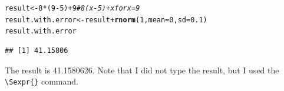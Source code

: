 \documentclass{article}\usepackage[]{graphicx}\usepackage[]{xcolor}
\makeatletter
\newcommand{\hlnum}[1]{\textcolor[rgb]{0.686,0.059,0.569}{#1}}%
\newcommand{\hlcom}[1]{\textcolor[rgb]{0.678,0.584,0.686}{\textit{#1}}}%
\newcommand{\hlopt}[1]{\textcolor[rgb]{0,0,0}{#1}}%
\newcommand{\hldef}[1]{\textcolor[rgb]{0.345,0.345,0.345}{#1}}%
\newcommand{\hlkwb}[1]{\textcolor[rgb]{0.69,0.353,0.396}{#1}}%
\newcommand{\hlkwc}[1]{\textcolor[rgb]{0.333,0.667,0.333}{#1}}%
\newcommand{\hlkwd}[1]{\textcolor[rgb]{0.737,0.353,0.396}{\textbf{#1}}}%
\newenvironment{kframe}{%
 \def\at@end@of@kframe{}%
 \ifinner\ifhmode%
  \def\at@end@of@kframe{\end{minipage}}%
  \begin{minipage}{\columnwidth}%
 \fi\fi%
 \def\FrameCommand##1{\hskip\@totalleftmargin \hskip-\fboxsep
 \colorbox{shadecolor}{##1}\hskip-\fboxsep
     \hskip-\linewidth \hskip-\@totalleftmargin \hskip\columnwidth}%
 \MakeFramed {\advance\hsize-\width
   \@totalleftmargin\z@ \linewidth\hsize
   \@setminipage}}%
 {\par\unskip\endMakeFramed%
 \at@end@of@kframe}
\newenvironment{knitrout}{}{} %
\makeatother
\begin{document}
\begin{multicols}{2}
\begin{knitrout}
\color{fgcolor}\begin{kframe}
\begin{alltt}
\hldef{result} \hlkwb{<-} \hlnum{8}\hlopt{*}\hldef{(}\hlnum{9}\hlopt{-}\hlnum{5}\hldef{)}\hlopt{+} \hlnum{9} \hlcom{# 8(x-5) + x for x = 9}
\hldef{result.with.error} \hlkwb{<-} \hldef{result} \hlopt{+} \hlkwd{rnorm}\hldef{(}\hlnum{1}\hldef{,} \hlkwc{mean} \hldef{=} \hlnum{0}\hldef{,} \hlkwc{sd} \hldef{=} \hlnum{0.1}\hldef{)}
\hldef{result.with.error}
\end{alltt}
\begin{verbatim}
## [1] 41.15806
\end{verbatim}
\end{kframe}
\end{knitrout}
\indent The result is 41.1580626. Note that I did not type the result, but I used the \verb|\Sexpr{}| command. 


\end{multicols}
\end{document}

